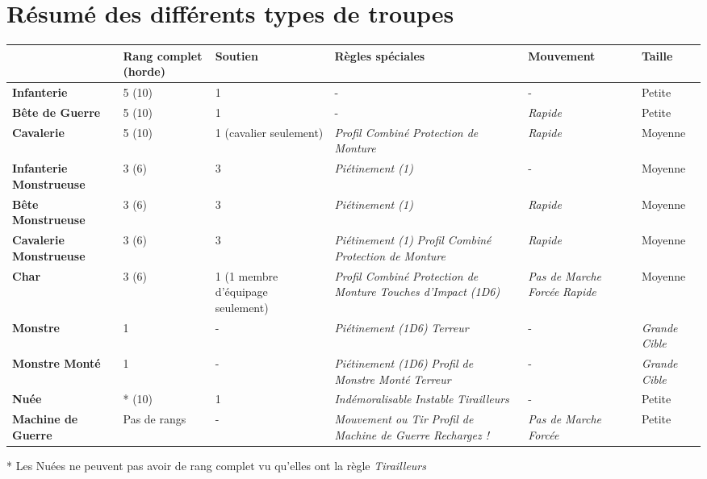 \newpage
\section*{Résumé des différents types de troupes}

\renewcommand{\arraystretch}{1.48}
\begin{table}[!htbp]
\centering
\begin{tabular}{M{2.5cm}|M{2cm}M{2cm}M{3cm}M{2.3cm}M{2cm}}
 & \textbf{Rang complet (horde)} & \textbf{Soutien} & \textbf{Règles spéciales} & \textbf{Mouvement} & \textbf{Taille} \\
\hline
\textbf{Infanterie} & 5 (10) & 1 & - & - & Petite \\
\hline
\textbf{Bête de Guerre} & 5 (10) & 1 & - & \emph{Rapide} & Petite \\
\hline
\textbf{Cavalerie} & 5 (10) & 1 (cavalier seulement) & \emph{Profil Combiné} \newline \emph{Protection de Monture} & \emph{Rapide} & Moyenne \\
\hline
\textbf{Infanterie Monstrueuse} & 3 (6) & 3 & \emph{Piétinement (1)} & - & Moyenne \\
\hline
\textbf{Bête Monstrueuse} & 3 (6) & 3 & \emph{Piétinement (1)} & \emph{Rapide} & Moyenne \\
\hline
\textbf{Cavalerie Monstrueuse} & 3 (6) & 3 & \emph{Piétinement (1)} \newline \emph{Profil Combiné} \newline \emph{Protection de Monture}  & \emph{Rapide} & Moyenne \\
\hline
\textbf{Char} & 3 (6) & 1 \newline (1 membre d'équipage seulement) & \emph{Profil Combiné} \newline \emph{Protection de Monture} \newline \emph{Touches d'Impact (1D6)} & \emph{Pas de Marche Forcée} \newline \emph{Rapide} & Moyenne \\
\hline
\textbf{Monstre} & 1 & - & \emph{Piétinement (1D6)} \newline \emph{Terreur} & - & \emph{Grande Cible} \\
\hline
\textbf{Monstre Monté} & 1 & - & \emph{Piétinement (1D6)} \newline \emph{Profil de Monstre Monté} \newline \emph{Terreur} & - & \emph{Grande Cible} \\
\hline
\textbf{Nuée} & * (10) & 1 & \emph{Indémoralisable} \newline \emph{Instable} \newline \emph{Tirailleurs} & - & Petite \\
\hline
\textbf{Machine de Guerre} & Pas de rangs & - & \emph{Mouvement ou Tir} \newline \emph{Profil de Machine de Guerre} \newline \emph{Rechargez !} & \emph{Pas de Marche Forcée} & Petite \\
\hline
\end{tabular}
* Les Nuées ne peuvent pas avoir de rang complet vu qu'elles ont la règle \emph{Tirailleurs}
\end{table}
\renewcommand{\arraystretch}{1.5}